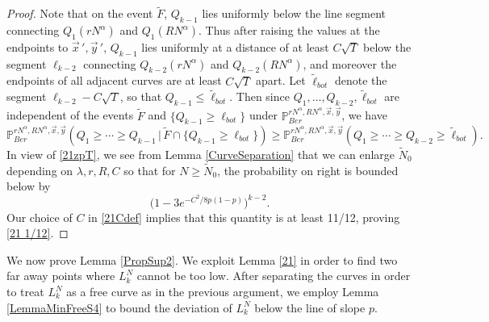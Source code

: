 \begin{proof}
		Note that on the event $\tilde F$, $Q_{k-1}$ lies uniformly below the line segment connecting $Q_1(rN^\alpha)$ and $Q_1(RN^\alpha)$. Thus after raising the values at the endpoints to $\vec{x}\,',\vec{y}\,'$, $Q_{k-1}$ lies uniformly at a distance of at least $C\sqrt{T}$ below the segment $\ell_{k-2}$ connecting $Q_{k-2}(rN^\alpha)$ and $Q_{k-2}(RN^\alpha)$, and moreover the endpoints of all adjacent curves are at least $C\sqrt{T}$ apart. Let $\tilde{\ell}_{bot}$ denote the segment $\ell_{k-2} - C\sqrt{T}$, so that $Q_{k-1} \leq \tilde\ell_{bot}$. Then since $Q_1,\dots,Q_{k-2},\tilde \ell_{bot}$ are independent of the events $\tilde F$ and $\{Q_{k-1} \geq \ell_{bot}\}$ under $\mathbb{P}^{rN^\alpha, RN^\alpha,\vec{x},\vec{y}}_{Ber}$, we have 
		\[
		\mathbb{P}^{rN^\alpha, RN^\alpha,\vec{x},\vec{y}}_{Ber} \left(Q_1 \geq \cdots \geq Q_{k-1}\,\big|\,\tilde F\cap \{ Q_{k-1} \geq \ell_{bot}\}\right) \geq \mathbb{P}^{rN^\alpha, RN^\alpha,\vec{x},\vec{y}}_{Ber} \left(Q_1 \geq \cdots \geq Q_{k-2} \geq \tilde \ell_{bot}\right).
		\]
		In view of \eqref{21zpT}, we see from Lemma \ref{CurveSeparation} that we can enlarge $\tilde{N}_0$ depending on $\lambda, r, R, C$ so that for $N\geq\tilde{N}_0$, the probability on right is bounded below by
		\[
		\big(1-3e^{-C^2/8p(1-p)}\big)^{k-2}.
		\]
		Our choice of $C$ in \eqref{21Cdef} implies that this quantity is at least 11/12, proving \eqref{21 1/12}.
		
	\end{proof}

	We now prove Lemma \ref{PropSup2}. We exploit Lemma \ref{21} in order to find two far away points where $L_k^N$ cannot be too low. After separating the curves in order to treat $L_k^N$ as a free curve as in the previous argument, we employ Lemma \ref{LemmaMinFreeS4} to bound the deviation of $L_k^N$ below the line of slope $p$.
	
